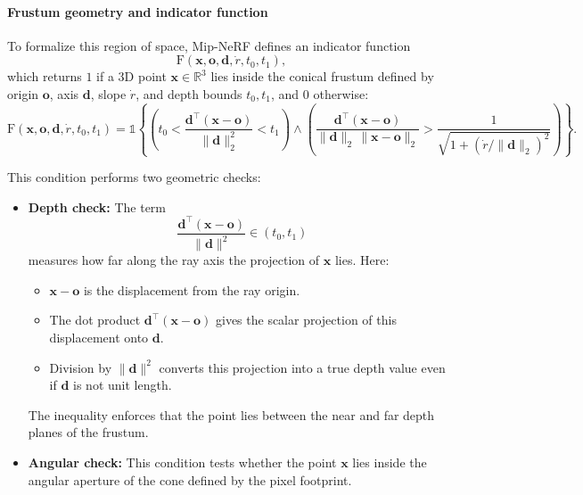 \begin{enrichment}
\begin{enrichment}
    \paragraph{Frustum geometry and indicator function}  
    To formalize this region of space, Mip-NeRF defines an indicator function
    \[
    \mathrm{F}(\mathbf{x}, \mathbf{o}, \mathbf{d}, \dot{r}, t_0, t_1),
    \]
    which returns \( 1 \) if a 3D point \( \mathbf{x} \in \mathbb{R}^3 \) lies inside the conical frustum defined by origin \( \mathbf{o} \), axis \( \mathbf{d} \), slope \( \dot{r} \), and depth bounds \( t_0, t_1 \), and \( 0 \) otherwise:
    \begin{equation}
        \mathrm{F}(\mathbf{x}, \mathbf{o}, \mathbf{d}, \dot{r}, t_0, t_1) =
        \mathbb{1} \left\{
        \left( t_0 < \frac{\mathbf{d}^\top (\mathbf{x} - \mathbf{o})}{\|\mathbf{d}\|_2^2} < t_1 \right)
        \land
        \left( \frac{\mathbf{d}^\top (\mathbf{x} - \mathbf{o})}{\|\mathbf{d}\|_2 \, \|\mathbf{x} - \mathbf{o}\|_2} >
        \frac{1}{\sqrt{1 + (\dot{r} / \|\mathbf{d}\|_2)^2}} \right)
        \right\}.
        \label{eq:chapter23_mipnerf_indicator}
    \end{equation}
    
    This condition performs two geometric checks:
    
    \begin{itemize}
        \item \textbf{Depth check:}  
        The term
        \[
        \frac{\mathbf{d}^\top (\mathbf{x} - \mathbf{o})}{\|\mathbf{d}\|^2} \in (t_0, t_1)
        \]
        measures how far along the ray axis the projection of \( \mathbf{x} \) lies.  
        Here:
        \begin{itemize}
            \item \( \mathbf{x} - \mathbf{o} \) is the displacement from the ray origin.
            \item The dot product \( \mathbf{d}^\top (\mathbf{x} - \mathbf{o}) \) gives the scalar projection of this displacement onto \( \mathbf{d} \).
            \item Division by \( \|\mathbf{d}\|^2 \) converts this projection into a true depth value even if \( \mathbf{d} \) is not unit length.
        \end{itemize}
        The inequality enforces that the point lies between the near and far depth planes of the frustum.
        
        \item \textbf{Angular check:}  
        This condition tests whether the point $\mathbf{x}$ lies inside the angular aperture of the cone defined by the pixel footprint.
        

\end{itemize}
\end{enrichment}
\end{enrichment}
